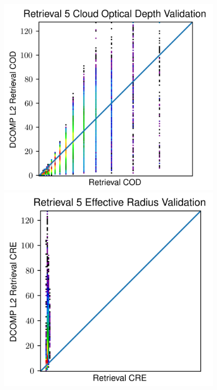 \documentclass[12pt]{article}
\begin{document}
\begin{figure}[h!]
\begin{center}
{            \includegraphics[width=.36\paperwidth]{figs/val_ret5_cod.png}
            \includegraphics[width=.34\paperwidth]{figs/val_ret5_cre.png}
        }
        \makebox[\textwidth]{
}
\end{center}
\end{figure}
\end{document}

